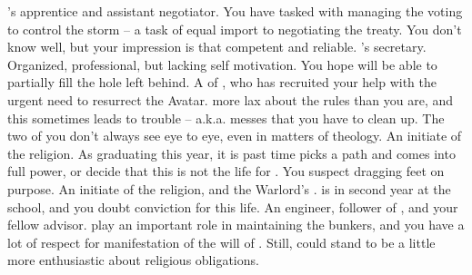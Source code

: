 \documentclass[char]{GL2020}
\begin{document}
\begin{contacts}
	\contact{\cJuniorStatesman{}} \cHeadDiplomat{}'s apprentice and assistant negotiator. You have tasked \cJuniorStatesman{} with managing the voting to control the storm -- a task of equal import to negotiating the treaty. You don't know \cJuniorStatesman{\them} well, but your impression is that \cJuniorStatesman{\theyare} competent and reliable.
	\contact{\cChupLeader{}} \cHeadDiplomat{}'s secretary. Organized, professional, but lacking self motivation. You hope \cChupLeader{\they} will be able to partially fill the hole \cHeadDiplomat{} left behind.
	\contact{\cFlowPriest{}} A \cFlowPriest{\cleric} of \cFlow{}, who has recruited your help with the urgent need to resurrect the \cEbb{} Avatar. \cFlowPriest{\Theyare} more lax about the rules than you are, and this sometimes leads to trouble – a.k.a. messes that you have to clean up. The two of you don't always see eye to eye, even in matters of theology.
	\contact{\cInitiate{}} An initiate of the \pShippie{} religion. As \cInitiate{\they} \cInitiate{\are} graduating this year, it is past time \cInitiate{} picks a path and comes into \cInitiate{\their} full power, or decide that this is not the life for \cInitiate{\them}. You suspect \cInitiate{\theyare} dragging \cInitiate{\their} feet on purpose.
	\contact{\cWarlordDaughter{}} An initiate of the \pShippie{} religion, and the Warlord's \cWarlordDaughter{\child}. \cWarlordDaughter{} is in \cWarlordDaughter{\their} second year at the school, and you doubt \cWarlordDaughter{\their} conviction for this life.
	\contact{\cBunker{}} An engineer, follower of \textcolor{red}{\cEbb{} \sout{\cFlow{}}}, and your fellow advisor. \cBunker{\They} play\cBunker{\plural} an important role in maintaining the bunkers, and you have a lot of respect for \cBunker{\their} manifestation of the will of \cFlow{}. Still, \cBunker{\they} could stand to be a little more enthusiastic about \cBunker{\their} religious obligations.
\end{contacts}
\end{document}
